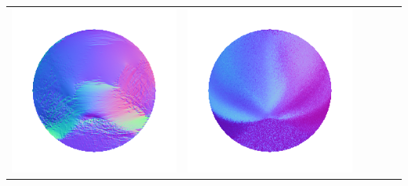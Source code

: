 \begin{tabularx}{\linewidth}{@{}Y@{}Y@{}Y@{}Y@{}Y@{}Y@{}}
\includegraphics[width=\linewidth]{semisynthetic/20150514_13_yu_out.png} &
\includegraphics[width=\linewidth]{semisynthetic/20150514_13_dpsn_out.png} &

\end{tabularx}
